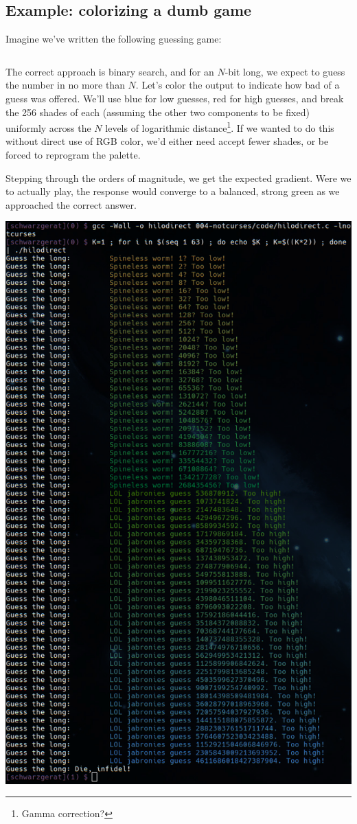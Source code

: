 \documentclass[letterpaper,10pt]{article}
\begin{document}
\subsection{Example: colorizing a dumb game}

Imagine we've written the following guessing game:

\begin{listing}[ht]
\inputminted[fontsize=\scriptsize]{C}{code/hilostdio.c}
\end{listing}

The correct approach is binary search, and for an $N$-bit long, we expect to
guess the number in no more than $N$. Let's color the output to indicate how
bad of a guess was offered. We'll use blue for low guesses, red for high
guesses, and break the 256 shades of each (assuming the other two components
to be fixed) uniformly across the $N$ levels of logarithmic
distance\footnote{Gamma correction?}. If we wanted to do this without direct
use of RGB color, we'd either need accept fewer shades, or be forced to
reprogram the palette.

Stepping through the orders of magnitude, we get the expected gradient. Were
we to actually play, the response would converge to a balanced, strong green
as we approached the correct answer.

\begin{center}
\includegraphics[width=.75\linewidth]{media/hilodirect.png}
\end{center}
\newpage
\end{document}
